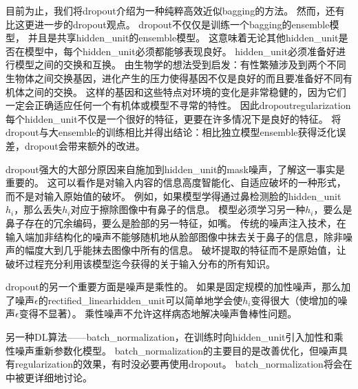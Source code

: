 
目前为止，我们将\gls{dropout}介绍为一种纯粹高效近似\gls{bagging}的方法。
然而，还有比这更进一步的\gls{dropout}观点。
\gls{dropout}不仅仅是训练一个\gls{bagging}的\gls{ensemble}模型，
并且是共享\gls{hidden_unit}的\gls{ensemble}模型。
这意味着无论其他\gls{hidden_unit}是否在模型中，每个\gls{hidden_unit}必须都能够表现良好。
\gls{hidden_unit}必须准备好进行模型之间的交换和互换。
\cite{Hinton-et-al-2012c}由生物学的想法受到启发：有性繁殖涉及到两个不同生物体之间交换基因，进化产生的压力使得基因不仅是良好的而且要准备好不同有机体之间的交换。
这样的基因和这些特点对环境的变化是非常稳健的，因为它们一定会正确适应任何一个有机体或模型不寻常的特性。
因此\gls{dropout}\gls{regularization}每个\gls{hidden_unit}不仅是一个很好的特征，更要在许多情况下是良好的特征。
\cite{WardeFarley-et-al-2014}将\gls{dropout}与大\gls{ensemble}的训练相比并得出结论：相比独立模型\gls{ensemble}获得泛化误差，\gls{dropout}会带来额外的改进。

\gls{dropout}强大的大部分原因来自施加到\gls{hidden_unit}的\gls{mask}噪声，了解这一事实是重要的。
这可以看作是对输入内容的信息高度智能化、自适应破坏的一种形式，而不是对输入原始值的破坏。
例如，如果模型学得通过鼻检测脸的\gls{hidden_unit} $h_i$，那么丢失$h_i$对应于擦除图像中有鼻子的信息。
模型必须学习另一种$h_i$，要么是鼻子存在的冗余编码，要么是脸部的另一特征，如嘴。
传统的噪声注入技术，在输入端加非结构化的噪声不能够随机地从脸部图像中抹去关于鼻子的信息，除非噪声的幅度大到几乎能抹去图像中所有的信息。
破坏提取的特征而不是原始值，让破坏过程充分利用该模型迄今获得的关于输入分布的所有知识。

\gls{dropout}的另一个重要方面是噪声是乘性的。
如果是固定规模的加性噪声，那么加了噪声$\epsilon$的\gls{rectified_linear}\gls{hidden_unit}可以简单地学会使$h_i$变得很大（使增加的噪声$\epsilon$变得不显著）。
乘性噪声不允许这样病态地解决噪声鲁棒性问题。


另一种\gls{DL}算法——\gls{batch_normalization}，在训练时向\gls{hidden_unit}引入加性和乘性噪声重新参数化模型。
\gls{batch_normalization}的主要目的是改善优化，但噪声具有\gls{regularization}的效果，有时没必要再使用\gls{dropout}。
\gls{batch_normalization}将会在中被更详细地讨论。



